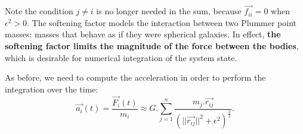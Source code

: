 Note the condition $j\ne i$ is no longer needed in the sum, because $\vec{f_{ii}} = 0$ when $\epsilon ^2 > 0$.
The softening factor models the interaction between two Plummer point masses: masses that behave as if they were spherical galaxies.
In effect, \textbf{the softening factor limits the magnitude of the force between the bodies}, which is desirable for numerical integration of the system state.

As before, we need to compute the acceleration in order to perform the integration over the time:
\begin{equation}
\label{eq:accelerationSoft}
	\vec{a_i}(t) = \frac{\vec{F_i}(t)}{m_i} \approx G.\sum_{j = 1}^{n}\frac{m_j.\vec{r_{ij}}}{(||\vec{r_{ij}}||^2 + \epsilon^2)^\frac{3}{2}}.
\end{equation}